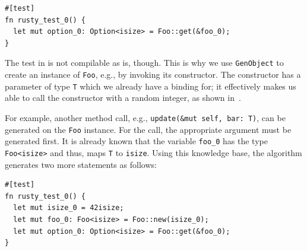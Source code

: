 \documentclass[paper=a4,%
  twoside,%
  BCOR4mm,%
  abstract=true,%
  toc=bibliography,%
  chapterprefix=true,%
  toc=bibliographynumbered,%
  open=right,%
  english,%
  pagesize=pdftex]{scrreprt}
\begin{document}
\begin{lstlisting}[style=boxed, caption={}, label=lst:building-generic-test-1]
#[test]
fn rusty_test_0() {
  let mut option_0: Option<isize> = Foo::get(&foo_0);
}
\end{lstlisting}
The test in  is not compilable as is, though. This is why we use \texttt{GenObject} to create an instance of \texttt{Foo}, e.g., by invoking its constructor. The constructor has a parameter of type \texttt{T} which we already have a binding for; it effectively makes us able to call the constructor with a random integer, as shown in~.

For example, another method call, e.g., \texttt{update(\string&mut self, bar: T)}, can be generated on the \texttt{Foo} instance. For the call, the appropriate argument must be generated first. It is already known that the variable \texttt{foo\string_0} has the type \texttt{Foo<isize>} and thus, maps \texttt{T} to \texttt{isize}. Using this knowledge base, the algorithm generates two more statements as follows:

\begin{lstlisting}[style=boxed, caption={}, label=lst:building-generic-test-2]
#[test]
fn rusty_test_0() {
  let mut isize_0 = 42isize;
  let mut foo_0: Foo<isize> = Foo::new(isize_0);
  let mut option_0: Option<isize> = Foo::get(&foo_0);
}
\end{lstlisting}



%
%
%
\end{document}
